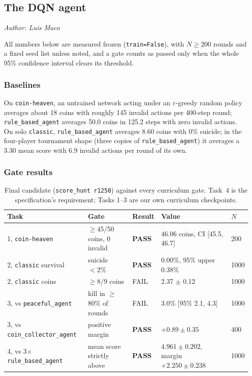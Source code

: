 \documentclass[11pt]{article}
\newcommand{\authorline}[1]{\noindent\textit{Author: #1}\par\medskip}
\newcommand{\code}[1]{\texttt{#1}}
\begin{document}
\subsection{The DQN agent}
\label{sec:results_dqn}
\authorline{Luis Maco}

All numbers below are measured frozen (\code{train=False}), with $N \geq 200$ rounds and a
fixed seed list unless noted, and a gate counts as passed only when the whole 95\%
confidence interval clears its threshold.

\subsubsection{Baselines}

On \code{coin-heaven}, an untrained network acting under an $\varepsilon$-greedy random
policy averages about 18 coins with roughly 145 invalid actions per 400-step round;
\code{rule\_based\_agent} averages 50.0 coins in 125.2 steps with zero invalid actions. On
solo \code{classic}, \code{rule\_based\_agent} averages 8.60 coins with 0\% suicide; in the
four-player tournament shape (three copies of \code{rule\_based\_agent}) it averages a 3.30
mean score with 6.9 invalid actions per round of its own.

\subsubsection{Gate results}

\begin{table}[h]
\centering
\small
\begin{tabular}{@{}lllll@{}}
\toprule
Task & Gate & Result & Value & $N$ \\
\midrule
1, \code{coin-heaven}    & $\geq$45/50 coins, 0 invalid           & \textbf{PASS} & 46.06 coins, CI [45.5, 46.7] & 200 \\
2, \code{classic} survival & suicide $<2\%$                       & \textbf{PASS} & 0.00\%, 95\% upper 0.38\%     & 1000 \\
2, \code{classic} coins    & $\geq$8/9 coins                      & FAIL          & 2.37 $\pm$ 0.12                & 1000 \\
3, vs \code{peaceful\_agent}   & kill in $\geq$80\% of rounds     & FAIL          & 3.0\% [95\% 2.1, 4.3]         & 1000 \\
3, vs \code{coin\_collector\_agent} & positive margin              & \textbf{PASS} & $+0.89 \pm 0.35$               & 400 \\
4, vs 3$\times$\code{rule\_based\_agent} & mean score strictly above & \textbf{PASS} & $4.961 \pm 0.202$, margin $+2.250 \pm 0.238$ & 1000 \\
\bottomrule
\end{tabular}
\caption{Final candidate (\code{score\_hunt r1250}) against every curriculum gate. Task~4 is
the specification's requirement; Tasks 1--3 are our own curriculum checkpoints.}
\end{table}
\end{document}
